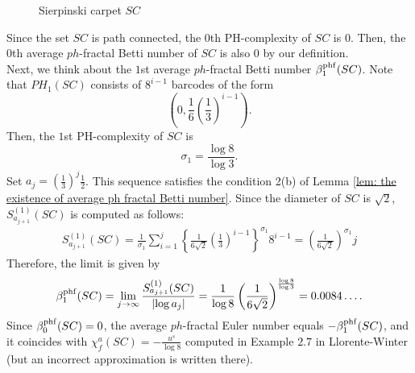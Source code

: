 \documentclass[12pt]{amsart}
\numberwithin{equation}{section}
\begin{document}
\begin{figure}[hbt]
\begin{minipage}{0.2\textwidth}
    \end{minipage}
    \caption{Sierpinski carpet $SC$}
    \label{fig: Sierpinski carpet}
    \end{figure}
    Since the set $SC$ is path connected, the $0$th PH-complexity of $SC$ is $0$.
    Then, the $0$th average $ph$-fractal Betti number of $SC$ is also $0$ by our definition.\\
    \indent
    Next, we think about the $1$st average $ph$-fractal Betti number $\beta_1 ^{\rm phf} (SC)$. 
    Note that $PH_1 (SC)$ consists of $8^{i-1}$ barcodes of the form
    \begin{equation*}
    \left( 0, \frac{1}{6} \left( \frac{1}{3}\right)^{i-1}\right).
    \end{equation*}
    Then, the $1$st PH-complexity of $SC$ is 
    \begin{equation*}
        \sigma_1 = \frac{\log 8}{\log 3}. 
    \end{equation*}
    Set $a_j = \left(\frac{1}{3}\right)^j \frac{1}{2}$. 
    This sequence satisfies the condition 2(b) of Lemma \ref{lem: the existence of average ph fractal Betti number}. 
    Since the diameter of $SC$ is $\sqrt{2}$, $S_{a_{j+1}}^{(1)} (SC)$ is computed as follows:
    \begin{align*}
    S_{a_{j+1}}^{(1)} (SC) = \frac{1}{\sigma_1}\sum_{i=1}^{j} \left\{\frac{1}{6\sqrt{2}}\left(\frac{1}{3}\right)^{i-1}\right\}^{\sigma_1} 8^{i-1}
    = \left(\frac{1}{6\sqrt{2}}\right)^{\sigma_1} j
    \end{align*}
    Therefore, the limit is given by
    \begin{equation*}
        \beta_1^{\rm phf} (SC) = \lim_{j \rightarrow \infty}\frac{S_{a_{j+1}}^{(1)}(SC)}{ \left| \log a_j\right|} = \frac{1}{ \log 8}\left(\frac{1}{6\sqrt{2}}\right)^{\frac{\log 8}{\log3}} = 0.0084\dots. 
    \end{equation*}
    Since $\beta_0^{\rm phf}(SC) =0$, the average $ph$-fractal Euler number equals $-\beta_1^{\rm phf}(SC)$, and it coincides with $\chi_f^{a} (SC) = -\frac{u^s}{\log 8}$ computed in Example $2.7$ in Llorente-Winter \cite{LW07} (but an incorrect approximation is written there).
\end{document}
